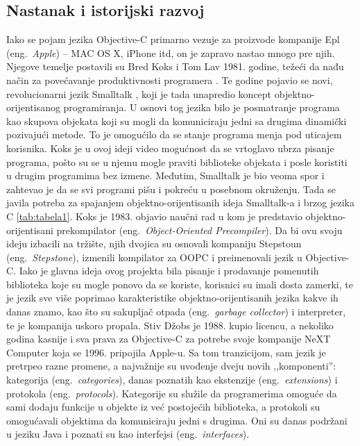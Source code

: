 \documentclass[a4paper]{article}
\begin{document}
{\subsection{Nastanak i istorijski razvoj}
\label{subsec:istorija}
Iako se pojam jezika Objective-C primarno vezuje za proizvode kompanije Epl (eng.~{\em Apple}) -- MAC OS X, iPhone itd, on je zapravo nastao mnogo pre njih. Njegove temelje postavili su Bred Koks i Tom Lav 1981. godine, težeći da nađu način za povećavanje produktivnosti programera \cite{history}. Te godine pojavio se novi, revolucionarni jezik Smalltalk \cite{smalltalk}, koji je tada unapredio koncept objektno-orijentisanog programiranja. U osnovi tog jezika bilo je posmatranje programa kao skupova objekata koji su mogli da komuniciraju jedni sa drugima dinamički pozivajući metode. To je omogućilo da se stanje programa menja pod uticajem korisnika. Koks je u ovoj ideji video mogućnost da se vrtoglavo ubrza pisanje programa, pošto su se u njemu mogle praviti biblioteke objekata i posle koristiti u drugim programima bez izmene. Međutim, Smalltalk je bio veoma spor i zahtevao je da se svi programi pišu i pokreću u posebnom okruženju. Tada se javila potreba za spajanjem objektno-orijentisanih ideja Smalltalk-a i brzog jezika C \ref{tab:tabela1}. Koks je 1983. objavio naučni rad u kom je predstavio objektno-orijentisani prekompilator (eng.~{\em Object-Oriented Precompiler}). Da bi ovu svoju ideju izbacili na tržište, njih dvojica su osnovali kompaniju Stepstoun (eng.~{\em Stepstone}), izmenili kompilator za OOPC i preimenovali jezik u Objective-C. Iako je glavna ideja ovog projekta bila pisanje i prodavanje pomenutih biblioteka koje su mogle ponovo da se koriste, korisnici su imali dosta zamerki, te je jezik sve više poprimao karakteristike objektno-orijentisanih jezika kakve ih danas znamo, kao što su sakupljač otpada (eng.~{\em garbage collector}) i interpreter, te je kompanija uskoro propala. Stiv Džobs je 1988. kupio licencu, a nekoliko godina kasnije i sva prava za Objective-C za potrebe svoje kompanije NeXT Computer koja se  1996. pripojila Apple-u. Sa tom tranzicijom, sam jezik je pretrpeo razne promene, a najvažnije su uvođenje dveju novih ,,komponenti'': kategorija (eng.~{\em categories}), danas poznatih kao ekstenzije (eng.~{\em extensions}) i protokola (eng.~{\em protocols}). Kategorije su služile da programerima omoguće da sami dodaju funkcije u objekte iz već postojećih biblioteka, a protokoli su omogućavali objektima da komuniciraju jedni s drugima. Oni su danas podržani u jeziku Java i poznati su kao interfejsi (eng.~{\em interfaces}). 

}
\end{document}
